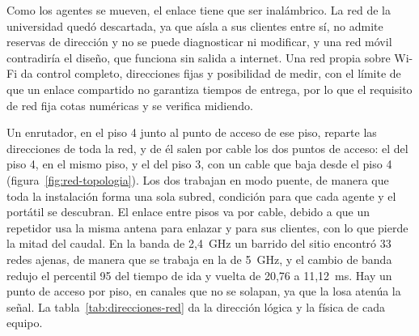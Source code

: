 Como los agentes se mueven, el enlace tiene que ser inalámbrico. La red de la universidad quedó descartada, ya que aísla a sus clientes entre sí, no admite reservas de dirección y no se puede diagnosticar ni modificar, y una red móvil contradiría el diseño, que funciona sin salida a internet. Una red propia sobre Wi-Fi da control completo, direcciones fijas y posibilidad de medir, con el límite de que un enlace compartido no garantiza tiempos de entrega, por lo que el requisito de red fija cotas numéricas y se verifica midiendo.

Un enrutador, en el piso 4 junto al punto de acceso de ese piso, reparte las direcciones de toda la red, y de él salen por cable los dos puntos de acceso: el del piso 4, en el mismo piso, y el del piso 3, con un cable que baja desde el piso 4 (figura~\ref{fig:red-topologia}). Los dos trabajan en modo puente, de manera que toda la instalación forma una sola subred, condición para que cada agente y el portátil se descubran. El enlace entre pisos va por cable, debido a que un repetidor usa la misma antena para enlazar y para sus clientes, con lo que pierde la mitad del caudal. En la banda de 2,4~GHz un barrido del sitio encontró 33 redes ajenas, de manera que se trabaja en la de 5~GHz, y el cambio de banda redujo el percentil 95 del tiempo de ida y vuelta de 20,76 a 11,12~ms. Hay un punto de acceso por piso, en canales que no se solapan, ya que la losa atenúa la señal. La tabla~\ref{tab:direcciones-red} da la dirección lógica y la física de cada equipo.

